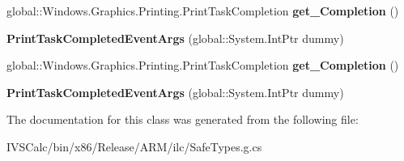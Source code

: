 \begin{DoxyCompactItemize}
\item 
\mbox{\label{class_windows_1_1_graphics_1_1_printing_1_1_print_task_completed_event_args_a63a585da0f76212b2b6c1936f99420e9}} 
global\+::\+Windows.\+Graphics.\+Printing.\+Print\+Task\+Completion {\bfseries get\+\_\+\+Completion} ()
\item 
\mbox{\label{class_windows_1_1_graphics_1_1_printing_1_1_print_task_completed_event_args_a067b1a43100c334c3d982bb6505a5aaf}} 
{\bfseries Print\+Task\+Completed\+Event\+Args} (global\+::\+System.\+Int\+Ptr dummy)
\item 
\mbox{\label{class_windows_1_1_graphics_1_1_printing_1_1_print_task_completed_event_args_a63a585da0f76212b2b6c1936f99420e9}} 
global\+::\+Windows.\+Graphics.\+Printing.\+Print\+Task\+Completion {\bfseries get\+\_\+\+Completion} ()
\item 
\mbox{\label{class_windows_1_1_graphics_1_1_printing_1_1_print_task_completed_event_args_a067b1a43100c334c3d982bb6505a5aaf}} 
{\bfseries Print\+Task\+Completed\+Event\+Args} (global\+::\+System.\+Int\+Ptr dummy)
\end{DoxyCompactItemize}


The documentation for this class was generated from the following file\+:\begin{DoxyCompactItemize}
\item 
I\+V\+S\+Calc/bin/x86/\+Release/\+A\+R\+M/ilc/Safe\+Types.\+g.\+cs\end{DoxyCompactItemize}
